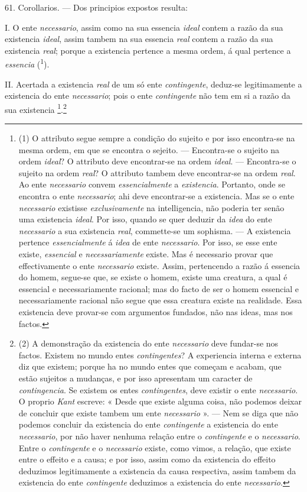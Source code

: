  61. Corollarios. --- Dos principios expostos resulta:

I. O ente \emph{necessario}, assim como na sua essencia \emph{ideal} contem a razão da sua existencia \emph{ideal}, assim tambem na sua essencia \emph{real} contem a razão da sua existencia \emph{real}; porque a existencia pertence a mesma ordem, á qual pertence a \emph{essencia} (\textsuperscript{1}).

II. Acertada a existencia \emph{real} de um só ente \emph{contingente}, deduz-se legitimamente a existencia do ente \emph{necessario}; pois o ente \emph{contingente} não tem em si a razão da sua existencia \footnote{(1) O attributo segue sempre a condição do sujeito e por isso encontra-se na mesma ordem, em que se encontra o sejeito. --- Encontra-se o sujeito na ordem \emph{ideal}? O attributo deve encontrar-se na ordem \emph{ideal}. --- Encontra-se o sujeito na ordem \emph{real}? O attributo tambem deve encontrar-se na ordem \emph{real}. Ao ente \emph{necessario} convem \emph{essencialmente} a \emph{existencia}. Portanto, onde se encontra o ente \emph{necessario}; ahi deve encontrar-se a existencia. Mas se o ente \emph{necessario} existisse \emph{exclusivamente} na intelligencia, não poderia ter senão uma existencia \emph{ideal}. Por isso, quando se quer deduzir da \emph{idea} do ente \emph{necessario} a sua existencia \emph{real}, commette-se um sophisma. --- A existencia pertence \emph{essencialmente} á \emph{idea} de ente \emph{necessario}. Por isso, se esse ente existe, \emph{essencial} e \emph{necessariamente} existe. Mas é necessario provar que effectivamente o ente \emph{necessario} existe. Assim, pertencendo a razão á essencia do homem, segue-se que, se existe o homem, existe uma creatura, a qual é essencial e necessariamente racional; mas do facto de ser o homem essencial e necessariamente racional não segue que essa creatura existe na realidade. Essa existencia deve provar-se com argumentos fundados, não nas ideas, mas nos factos.}.\footnote{(2) A demonstração da existencia do ente \emph{necessario} deve fundar-se nos factos. Existem no mundo entes \emph{contingentes}? A experiencia interna e externa diz que existem; porque ha no mundo entes que começam e acabam, que estão sujeitos a mudanças, e por isso apresentam um caracter de \emph{contingencia}. Se existem os entes \emph{contingentes}, deve existir o ente \emph{necessario}. O proprio \emph{Kant} escreve: « Desde que existe alguma coisa, não podemos deixar de concluir que existe tambem um ente \emph{necessario} ». --- Nem se diga que não podemos concluir da existencia do ente \emph{contingente} a existencia do ente \emph{necessario}, por não haver nenhuma relação entre o \emph{contingente} e o \emph{necessario}. Entre o \emph{contingente} e o \emph{necessario} existe, como vimos, a relação, que existe entre o effeito e a causa; e por isso, assim como da existencia do effeito deduzimos legitimamente a existencia da causa respectiva, assim tambem da existencia do ente \emph{contingente} deduzimos a existencia do ente \emph{necessario}.}
